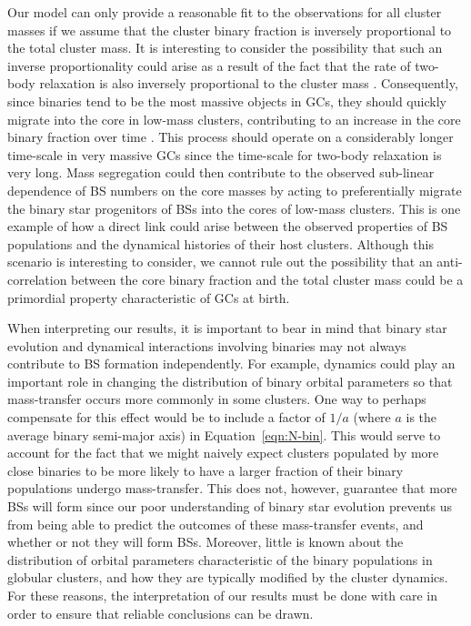 Our model can only provide a
reasonable fit to the observations for all cluster masses if we assume
that the cluster binary fraction is inversely proportional to the total
cluster mass.  It is interesting to consider the possibility that such
an inverse proportionality could 
arise as a result of the fact that the rate of two-body relaxation is
also inversely proportional to the cluster mass \citep{spitzer87}.
Consequently, since binaries tend to be the most massive objects in
GCs, they should quickly migrate into the core in low-mass clusters,
contributing to an increase in the core binary fraction over
time \citep{fregeau09}.  This process should operate on a considerably
longer time-scale in very massive GCs since the time-scale for
two-body relaxation is very long.  Mass segregation could then 
contribute to the observed sub-linear dependence of BS numbers
on the core masses by acting to preferentially migrate the binary star
progenitors of BSs into the cores of low-mass clusters.  This is one
example of how a direct link could arise between the observed
properties of BS 
populations and the dynamical histories of their host clusters.
Although this scenario is interesting to consider, we 
cannot rule out the possibility that an anti-correlation between the
core binary fraction and the total cluster mass could be a primordial
property characteristic of GCs at birth.

When interpreting our results, it is important to bear in mind that
binary star evolution and dynamical interactions involving binaries
may not always contribute to BS formation independently.  For example,
dynamics could play an important role in changing the distribution of
binary orbital parameters so that mass-transfer occurs more commonly
in some clusters.  
One way to perhaps compensate for this effect would be to include 
a factor of $1/a$ (where $a$ is the average binary semi-major axis) in
Equation~\ref{eqn:N-bin}.  This would serve to account for the fact
that we might naively expect clusters populated by more close binaries
to be 
more likely to have a larger fraction of their binary populations
undergo mass-transfer.  This does not, however, guarantee that more
BSs will form since our poor understanding of binary star evolution
prevents us from being able to predict the outcomes of these
mass-transfer events, and whether or not they will form BSs.
Moreover, little is known about the distribution of orbital
parameters characteristic of the binary populations in globular
clusters, and how they are typically modified by the cluster
dynamics.  For 
these reasons, the interpretation of our results must be done with
care in order to ensure that reliable conclusions can be drawn.

